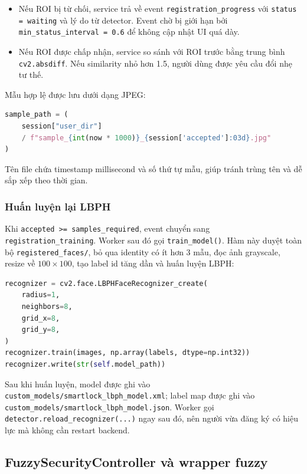 \begin{itemize}
    \item Nếu ROI bị từ chối, service trả về event \texttt{registration\_progress} với \texttt{status = waiting} và lý do từ detector. Event chờ bị giới hạn bởi \texttt{min\_status\_interval = 0.6} để không cập nhật UI quá dày.
    \item Nếu ROI được chấp nhận, service so sánh với ROI trước bằng trung bình \texttt{cv2.absdiff}. Nếu similarity nhỏ hơn 1.5, người dùng được yêu cầu đổi nhẹ tư thế.
\end{itemize}

Mẫu hợp lệ được lưu dưới dạng JPEG:

\begin{lstlisting}[language=Python, caption={Cách đặt tên file mẫu đăng ký}]
sample_path = (
    session["user_dir"]
    / f"sample_{int(now * 1000)}_{session['accepted']:03d}.jpg"
)
\end{lstlisting}

Tên file chứa timestamp millisecond và số thứ tự mẫu, giúp tránh trùng tên và dễ sắp xếp theo thời gian.

\subsubsection{Huấn luyện lại LBPH}

Khi \texttt{accepted >= samples\_required}, event chuyển sang \texttt{registration\_training}. Worker sau đó gọi \texttt{train\_model()}. Hàm này duyệt toàn bộ \texttt{registered\_faces/}, bỏ qua identity có ít hơn 3 mẫu, đọc ảnh grayscale, resize về $100\times100$, tạo label id tăng dần và huấn luyện LBPH:

\begin{lstlisting}[language=Python, caption={Huấn luyện LBPH trong FaceRegistrationManager}]
recognizer = cv2.face.LBPHFaceRecognizer_create(
    radius=1,
    neighbors=8,
    grid_x=8,
    grid_y=8,
)
recognizer.train(images, np.array(labels, dtype=np.int32))
recognizer.write(str(self.model_path))
\end{lstlisting}

Sau khi huấn luyện, model được ghi vào \texttt{custom\_models/smartlock\_lbph\_model.xml}; label map được ghi vào \texttt{custom\_models/smartlock\_lbph\_model.json}. Worker gọi \texttt{detector.reload\_recognizer(...)} ngay sau đó, nên người vừa đăng ký có hiệu lực mà không cần restart backend.

\subsection{FuzzySecurityController và wrapper fuzzy}

